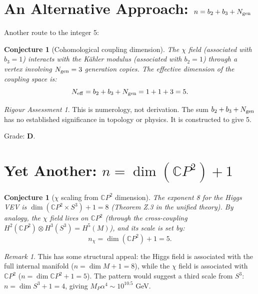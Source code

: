 \documentclass[11pt]{article}
\newtheorem{conjecture}[theorem]{Conjecture}
\theoremstyle{definition}
\theoremstyle{remark}
\newtheorem*{remark}{Remark}
\newtheorem*{assessment}{Rigour Assessment}
\newcommand{\CP}{\mathbb{C}P}
\begin{document}
\section{An Alternative Approach: $n = b_2 + b_3 + N_{\rm gen}$}
\label{sec:alternative}

Another route to the integer 5:

\begin{conjecture}[Cohomological coupling dimension]
The $\chi$ field (associated with $b_3 = 1$) interacts with the K\"ahler modulus
(associated with $b_2 = 1$) through a vertex involving $N_{\rm gen} = 3$
generation copies. The effective dimension of the coupling space is:
\begin{equation}
N_{\rm eff} = b_2 + b_3 + N_{\rm gen} = 1 + 1 + 3 = 5.
\end{equation}
\end{conjecture}

\begin{assessment}
This is numerology, not derivation. The sum $b_2 + b_3 + N_{\rm gen}$ has no
established significance in topology or physics. It is constructed to give 5.

Grade: \textbf{D}.
\end{assessment}


\section{Yet Another: $n = \dim(\CP^2) + 1$}
\label{sec:dim-plus-one}

\begin{conjecture}[$\chi$ scaling from $\CP^2$ dimension]
The exponent 8 for the Higgs VEV is $\dim(\CP^2 \times S^3) + 1 = 8$
(Theorem Z.3 in the unified theory). By analogy, the $\chi$ field lives on
$\CP^2$ (through the cross-coupling $H^2(\CP^2) \otimes H^3(S^3) = H^5(M)$),
and its scale is set by:
\begin{equation}
n_\chi = \dim(\CP^2) + 1 = 5.
\end{equation}
\end{conjecture}

\begin{remark}
This has some structural appeal: the Higgs field is associated with the full
internal manifold ($n = \dim M + 1 = 8$), while the $\chi$ field is associated
with $\CP^2$ ($n = \dim \CP^2 + 1 = 5$). The pattern would suggest a third
scale from $S^3$: $n = \dim S^3 + 1 = 4$, giving $M_P\alpha^4 \sim 10^{10.5}$ GeV.
\end{remark}
\end{document}
